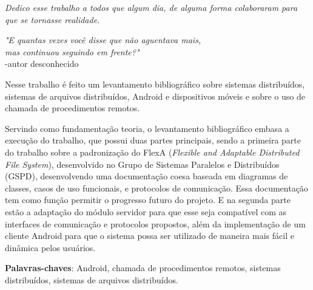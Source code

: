 \documentclass[
	12pt,				%
	openright,			%
	oneside,			%
	a4paper,			%
	english,			%
	brazil				%
	]{abntex2}
\begin{document}
\begin{dedicatoria}
   \vspace*{\fill}
   \centering
   \noindent
   \textit{ Dedico esse trabalho a todos que algum dia, de alguma forma colaboraram para que se tornasse realidade.} \vspace*{\fill}
\end{dedicatoria}

\begin{comment}

\begin{agradecimentos}

Agradeço a todos que algum dia, de alguma forma colaboraram para que se tornasse realidade.

\end{agradecimentos}

\end{comment}


\begin{epigrafe}
    \vspace*{\fill}
	\begin{flushright}
		\textit{"E quantas vezes você disse que não aguentava mais,\\ mas continuou seguindo em frente?"} \\
		-autor desconhecido
	\end{flushright}
\end{epigrafe}


\setlength{\absparsep}{18pt} %
\begin{resumo}
 
    Nesse trabalho é feito um levantamento bibliográfico sobre sistemas distribuídos, sistemas de arquivos distribuídos, Android e dispositivos móveis e sobre o uso de chamada de procedimentos remotos. 
 
    Servindo como fundamentação teoria, o levantamento bibliográfico embasa a execução do trabalho, que possui duas partes principais, sendo a primeira parte do trabalho sobre a padronização do FlexA (\textit{Flexible and Adaptable Distributed File System}), desenvolvido no Grupo de Sistemas Paralelos e Distribuídos (GSPD), desenvolvendo uma documentação coesa baseada em diagramas de classes, casos de uso funcionais, e protocolos de comunicação. Essa documentação tem como função permitir o progresso futuro do projeto. E na segunda parte estão a adaptação do módulo servidor para que esse seja compatível com as interfaces de comunicação e protocolos propostos, além da implementação de um cliente Android para que o sistema possa ser utilizado de maneira mais fácil e dinâmica pelos usuários.

 \textbf{Palavras-chaves}: Android, chamada de procedimentos remotos, sistemas distribuídos, sistemas de arquivos distribuídos.
\end{resumo}
\end{document}
